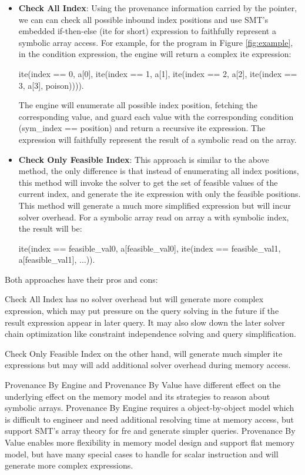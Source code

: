 \documentclass[sigplan, nonacm]{acmart}\settopmatter{printfolios=true,printccs=false,printacmref=false}
\begin{document}
\begin{itemize}
  \item \textbf{Check All Index}: Using the provenance information carried by the pointer, we can can check all possible inbound index positions and use SMT's embedded if-then-else (ite for short) expression to faithfully represent a symbolic array access. For example, for the program in Figure \ref{fig:example}, in the condition expression, the engine will return a complex ite expression: \par ite(index == 0, a[0], ite(index == 1, a[1], ite(index == 2, a[2], ite(index == 3, a[3], poison)))). \par
  The engine will enumerate all possible index position, fetching the corresponding value, and guard each value with the corresponding condition (sym\_index == position) and return a recursive ite expression. The expression will faithfully represent the result of a symbolic read on the array.
  \item \textbf{Check Only Feasible Index}: This approach is similar to the above method, the only difference is that instead of enumerating all index positions, this method will invoke the solver to get the set of feasible values of the current index, and generate the ite expression with only the feasible positions. This method will generate a much more simplified expression but will incur solver overhead. For a symbolic array read on array a with symbolic index, the result will be: \par ite(index == feasible\_val0, a[feasible\_val0], ite(index == feasible\_val1, a[feasible\_val1], $\dots$)). \par
\end{itemize}
Both approaches have their pros and cons: \par Check All Index has no solver overhead but will generate more complex expression, which may put pressure on the query solving in the future if the result expression appear in later query. It may also slow down the later solver chain optimization like constraint independence solving and query simplification.\par
Check Only Feasible Index on the other hand, will generate much simpler ite expressions but may will add additional solver overhead during memory access.\par
Provenance By Engine and Provenance By Value have different effect on the underlying effect on the memory model and its strategies to reason about symbolic arrays. Provenance By Engine requires a object-by-object model which is difficult to engineer and need additional resolving time at memory access, but support SMT's array theory for fre and generate simpler queries. Provenance By Value enables more flexibility in memory model design and support flat memory model, but have many special cases to handle for scalar instruction and will generate more complex expressions.
\end{document}
